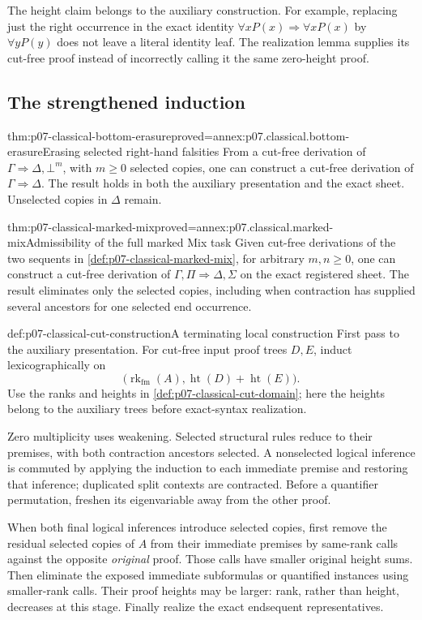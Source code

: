 The height claim belongs to the auxiliary construction. For example,
replacing just the right occurrence in the exact identity
\(\forall xP(x)\Rightarrow\forall xP(x)\) by
\(\forall yP(y)\) does not leave a literal identity leaf. The realization
lemma supplies its cut-free proof instead of incorrectly calling it the
same zero-height proof.

\subsection{The strengthened induction}

\begin{hblemma}{thm:p07-classical-bottom-erasure}{proved=annex:p07.classical.bottom-erasure}{Erasing selected right-hand falsities}
From a cut-free derivation of \(\Gamma\Rightarrow\Delta,\bot^m\), with
\(m\geq0\) selected copies, one can construct a cut-free derivation of
\(\Gamma\Rightarrow\Delta\). The result holds in both the auxiliary
presentation and the exact sheet. Unselected copies in \(\Delta\) remain.
\end{hblemma}

\begin{hbtheorem}{thm:p07-classical-marked-mix}{proved=annex:p07.classical.marked-mix}{Admissibility of the full marked Mix task}
Given cut-free derivations of the two sequents in
\cref{def:p07-classical-marked-mix}, for arbitrary \(m,n\geq0\), one
can construct a cut-free derivation of
\(\Gamma,\Pi\Rightarrow\Delta,\Sigma\) on the exact registered sheet.
The result eliminates only the selected copies, including when contraction
has supplied several ancestors for one selected end occurrence.
\end{hbtheorem}

\begin{hbmethod}{def:p07-classical-cut-construction}{A terminating local construction}
First pass to the auxiliary presentation. For cut-free input proof trees
\(D,E\), induct lexicographically on
\[
 \bigl(\operatorname{rk}_{\mathrm{fm}}(A),
       \operatorname{ht}(D)+\operatorname{ht}(E)\bigr).
\]
Use the ranks and heights in \cref{def:p07-classical-cut-domain}; here the
heights belong to the auxiliary trees before exact-syntax realization.

Zero multiplicity uses weakening. Selected structural rules reduce to their
premises, with both contraction ancestors selected. A nonselected logical
inference is commuted by applying the induction to each immediate premise
and restoring that inference; duplicated split contexts are contracted.
Before a quantifier permutation, freshen its eigenvariable away from the
other proof.

When both final logical inferences introduce selected copies, first remove
the residual selected copies of \(A\) from their immediate premises by
same-rank calls against the opposite \emph{original} proof. Those calls
have smaller original height sums. Then eliminate the exposed immediate
subformulas or quantified instances using smaller-rank calls. Their proof
heights may be larger: rank, rather than height, decreases at this stage.
Finally realize the exact endsequent representatives.
\end{hbmethod}

